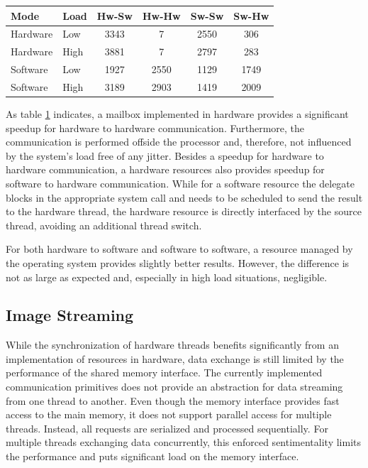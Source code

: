 \begin{table}
	\centering
	\label{tab:mbox_turn}
	\begin{tabular}{llcccc}
	\hline
	\textbf{Mode} & \textbf{Load} & \textbf{Hw-Sw} & \textbf{Hw-Hw} & \textbf{Sw-Sw} & \textbf{Sw-Hw}\\
	\hline
	Hardware & Low & 3343 & 7 & 2550 & 306\\
	Hardware & High & 3881 & 7 & 2797 & 283\\
	Software & Low & 1927 & 2550 & 1129 & 1749\\
	Software & High & 3189 & 2903 & 1419 & 2009\\
	\hline
	\end{tabular}
\end{table}
As table \ref{tab:mbox_turn} indicates, a mailbox implemented in hardware
provides a significant speedup for hardware to hardware communication.
Furthermore, the communication is performed offside the processor and,
therefore, not influenced by the system's load free of any jitter. Besides a
speedup for hardware to hardware communication, a hardware resources also
provides speedup for software to hardware communication. While for a software
resource the delegate blocks in the appropriate system call and needs to be
scheduled to send the result to the hardware thread, the hardware resource is
directly interfaced by the source thread, avoiding an additional thread
switch.

For both hardware to software and software to software, a resource managed by
the operating system provides slightly better results. However, the difference
is not as large as expected and, especially in high load situations,
negligible.

\subsection{Image Streaming}
While the synchronization of hardware threads benefits significantly from an
implementation of resources in hardware, data exchange is still limited by the
performance of the shared memory interface. The currently implemented
communication primitives does not provide an abstraction for data streaming
from one thread to another. Even though the memory interface provides fast
access to the main memory, it does not support parallel access for multiple
threads. Instead, all requests are serialized and processed sequentially. For
multiple threads exchanging data concurrently, this enforced sentimentality
limits the performance and puts significant load on the memory interface.

